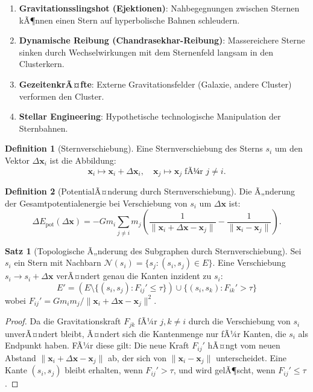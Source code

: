 ﻿\documentclass[a4paper,12pt]{report}
\theoremstyle{definition}
\newtheorem{definition}{Definition}
\newtheorem{satz}{Satz}
\begin{document}
\begin{enumerate}
    \item \textbf{Gravitationsslingshot (Ejektionen)}: Nahbegegnungen zwischen Sternen kÃ¶nnen einen Stern auf hyperbolische Bahnen schleudern.
    \item \textbf{Dynamische Reibung (Chandrasekhar-Reibung)}: Massereichere Sterne sinken durch Wechselwirkungen mit dem Sternenfeld langsam in den Clusterkern.
    \item \textbf{GezeitenkrÃ¤fte}: Externe Gravitationsfelder (Galaxie, andere Cluster) verformen den Cluster.
    \item \textbf{Stellar Engineering}: Hypothetische technologische Manipulation der Sternbahnen.
\end{enumerate}

\begin{definition}[Sternverschiebung]
Eine Sternverschiebung des Sterns $s_i$ um den Vektor $\Delta \mathbf{x}_i$ ist die Abbildung:
\[
\mathbf{x}_i \mapsto \mathbf{x}_i + \Delta \mathbf{x}_i, \quad \mathbf{x}_j \mapsto \mathbf{x}_j \; \text{fÃ¼r } j \neq i.
\]
\end{definition}

\begin{definition}[PotentialÃ¤nderung durch Sternverschiebung]
Die Ã„nderung der Gesamtpotentialenergie bei Verschiebung von $s_i$ um $\Delta \mathbf{x}$ ist:
\[
\Delta E_\mathrm{pot}(\Delta \mathbf{x}) = -G m_i \sum_{j \neq i} m_j \left( \frac{1}{\|\mathbf{x}_i + \Delta \mathbf{x} - \mathbf{x}_j\|} - \frac{1}{\|\mathbf{x}_i - \mathbf{x}_j\|} \right).
\]
\end{definition}

\begin{satz}[Topologische Ã„nderung des Subgraphen durch Sternverschiebung]
\label{satz:topologie}
Sei $s_i$ ein Stern mit Nachbarn $\mathcal{N}(s_i) = \{s_j : (s_i, s_j) \in E\}$. Eine Verschiebung $s_i \to s_i + \Delta \mathbf{x}$ verÃ¤ndert genau die Kanten inzident zu $s_i$:
\[
E' = \left(E \setminus \{(s_i, s_j) : F_{ij}' \leq \tau\}\right) \cup \{(s_i, s_k) : F_{ik}' > \tau\}
\]
wobei $F_{ij}' = G m_i m_j / \|\mathbf{x}_i + \Delta \mathbf{x} - \mathbf{x}_j\|^2$.
\end{satz}

\begin{proof}
Da die Gravitationskraft $F_{jk}$ fÃ¼r $j, k \neq i$ durch die Verschiebung von $s_i$ unverÃ¤ndert bleibt, Ã¤ndert sich die Kantenmenge nur fÃ¼r Kanten, die $s_i$ als Endpunkt haben. FÃ¼r diese gilt: Die neue Kraft $F_{ij}'$ hÃ¤ngt vom neuen Abstand $\|\mathbf{x}_i + \Delta\mathbf{x} - \mathbf{x}_j\|$ ab, der sich von $\|\mathbf{x}_i - \mathbf{x}_j\|$ unterscheidet. Eine Kante $(s_i, s_j)$ bleibt erhalten, wenn $F_{ij}' > \tau$, und wird gelÃ¶scht, wenn $F_{ij}' \leq \tau$.
\end{proof}
\end{document}
